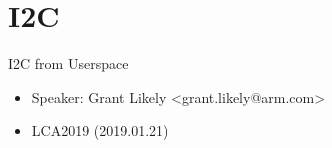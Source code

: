 \section{I2C}

\begin{frame}
   {I2C from Userspace}
   \begin{itemize}
      \item Speaker: Grant Likely \textless grant.likely@arm.com\textgreater
      \item LCA2019 (2019.01.21)
   \end{itemize}
\end{frame}

\cprotect{}

